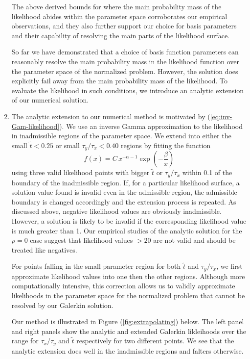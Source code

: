 \documentclass[10pt]{article}
\begin{document}
\begin{enumerate}
      The above derived bounds for where the main probability mass of
      the likelihood abides within the parameter space corroborates
      our empirical observations, and they also further support our
      choice for basis parameters and their capability of resolving
      the main parts of the likelihood surface.

      So far we have demonstrated that a choice of basis function
      parameters can reasonably resolve the main probability mass in
      the likelihood function over the parameter space of the
      normalized problem. However, the solution does explicitly fail
      away from the main probability mass of the likelihood. To
      evaluate the likelihood in such conditions, we introduce an
      analytic extension of our numerical solution.

    \item The analytic extension to our numerical method is motivated
      by (\ref{eq:inv-Gam-likelihood}). We use an inverse Gamma
      approximation to the likelihood in inadmissible regions of the
      parameter space. We extend into either the small $\tilde{t} < 0.25$ or
      small $\tau_y/\tau_x < 0.40$ regions by fitting the function
      \[
        f(x) = C\, x^{-\alpha-1} \exp\left( -\frac{\beta}{x} \right)
      \]
      using three valid likelihood points with bigger $\tilde{t}$ or
      $\tau_y/\tau_x$ within 0.1 of the boundary of the inadmissible
      region. If, for a particular likelihood surface, a solution
      value found is invalid even in the admissible region, the
      admissible boundary is changed accordingly and the extension
      process is repeated. As discussed above, negative likelihood
      values are obviously inadmissible. However, a solution is likely
      to be invalid if the corresponding likelihood value is much
      greater than 1. Our empirical studies of the analytic solution
      for the $\rho = 0$ case suggest that likelihood values $> 20$
      are not valid and should be treated like negatives.

      For points falling in the small parameter region for both
      $\tilde{t}$ and $\tau_y/\tau_x$, we first approximate likelihood
      values into one then the other regions. Although more
      computationally intensive, this correction allows us to validly
      approximate likelihoods in the parameter space for the
      normalized problem that cannot be resolved by our Galerkin
      solution.

      Our method is illustrated in Figure (\ref{fig:extrapolating})
      below. The left panel and right panels show the analytic and
      extended Galerkin likleihoods over the range for $\tau_x/\tau_y$
      and $\tilde{t}$ respectively for two different points. We see
      that the analytic extension does well in the inadmissible
      regions and falters otherwise.


\end{enumerate}
\end{document}
